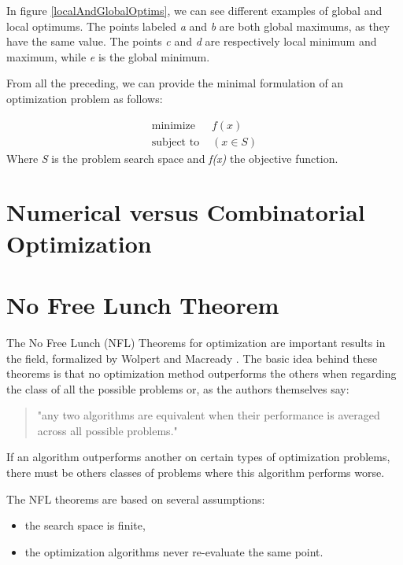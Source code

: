 In figure \ref{localAndGlobalOptims}, we can see different examples of global and local optimums. The points labeled \emph{a} and \emph{b} are both global maximums, as they have the same value. The points
\emph{c} and \emph{d} are respectively local minimum and maximum, while \emph{e} is the global minimum.

From all the preceding, we can provide the minimal formulation of an optimization problem as follows:

\begin{align*}
\text{minimize } &f(x) \\
\text{subject to } &(x \in S)
\end{align*}
Where \emph{S} is the problem search space and \emph{f(x)} the objective function.

\section{Numerical versus Combinatorial Optimization}

\section{No Free Lunch Theorem}

The No Free Lunch (NFL) Theorems for optimization are important results in the field, formalized by Wolpert and Macready \cite{585893}. The basic idea behind these theorems is that no optimization method outperforms the others when regarding the class of all the possible problems or, as the authors themselves say:
\begin{quote}
"any two algorithms are equivalent when their performance is averaged across all possible problems."
\end{quote}
If an algorithm outperforms another on certain types of optimization problems, there must be others classes of problems where this algorithm performs worse.

The NFL theorems are based on several assumptions:
\begin{itemize}

\item the search space is finite,

\item the optimization algorithms never re-evaluate the same point.

\end{itemize}

